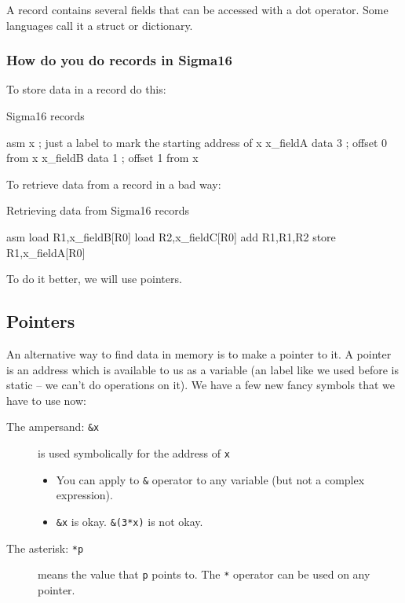 A record contains several fields that can be accessed with a dot operator.
Some languages call it a struct or dictionary.

\subsubsection{How do you do records in Sigma16}\label{ssub:how_do_you_do_records_in_sigma16}

To store data in a record do this:
\begin{highlight}{Sigma16 records}
	\begin{code}{asm}
		x ; just a label to mark the starting address of x
		x_fieldA data 3 ; offset 0 from x
		x_fieldB data 1 ; offset 1 from x
	\end{code}
\end{highlight}
To retrieve data from a record in a bad way:
\begin{highlight}{Retrieving data from Sigma16 records}
	\begin{code}{asm}
		load R1,x_fieldB[R0]
		load R2,x_fieldC[R0]
		add R1,R1,R2
		store R1,x_fieldA[R0]
	\end{code}
\end{highlight}
To do it better, we will use pointers.

\subsection{Pointers}\label{sub:pointers}

An alternative way to find data in memory is to make a pointer to it.
A pointer is an address which is available to us as a variable (an label like we used before is static -- we can't do operations on it).
We have a few new fancy symbols that we have to use now:
\begin{description}
	\item[The ampersand: \texttt{&x}] is used symbolically for the address of \texttt{x}
		\begin{itemize}
			\item You can apply to \texttt{&} operator to any variable (but not a complex expression).
			\item \texttt{&x} is okay.
			      \texttt{&(3*x)} is not okay.
		\end{itemize}
	\item[The asterisk: \texttt{*p}] means the value that \texttt{p} points to.
		The \texttt{*} operator can be used on any pointer.
\end{description}

